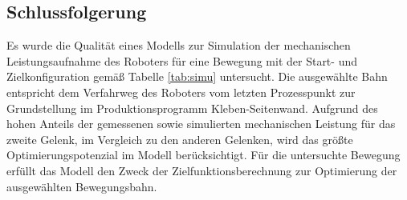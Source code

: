 \subsection*{Schlussfolgerung}
Es wurde die Qualität eines Modells zur Simulation der mechanischen Leistungsaufnahme des Roboters für eine Bewegung mit der Start- und Zielkonfiguration gemäß Tabelle \ref{tab:simu} untersucht. Die ausgewählte Bahn entspricht dem Verfahrweg des Roboters vom letzten Prozesspunkt zur Grundstellung im Produktionsprogramm Kleben-Seitenwand. Aufgrund des hohen Anteils der gemessenen sowie simulierten mechanischen Leistung für das zweite Gelenk, im Vergleich zu den anderen Gelenken, wird das größte Optimierungspotenzial im Modell berücksichtigt. Für die untersuchte Bewegung erfüllt das Modell den Zweck der Zielfunktionsberechnung zur Optimierung der ausgewählten Bewegungsbahn.
%